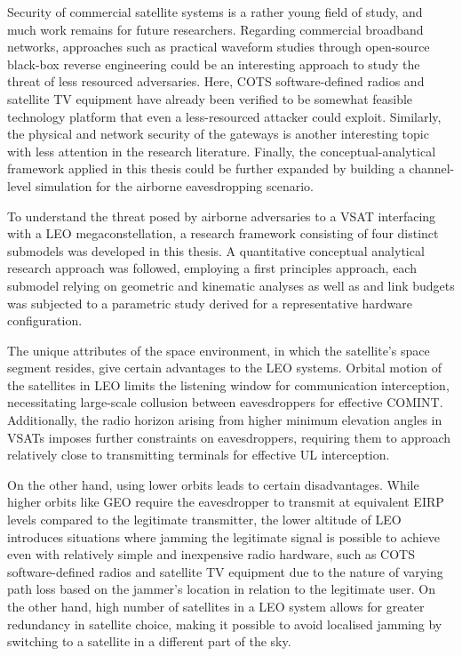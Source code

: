 \documentclass[english, 12pt, a4paper, elec, utf8, a-1b, online]{aaltothesis}
\begin{document}
Security of commercial satellite systems is a rather young field of study, and much work remains for future researchers.
Regarding commercial broadband networks, approaches such as practical waveform studies through open-source black-box reverse engineering could be an interesting approach to study the threat of less resourced adversaries.
Here, COTS software-defined radios and satellite TV equipment have already been verified to be somewhat feasible technology platform that even a less-resourced attacker could exploit.
Similarly, the physical and network security of the gateways is another interesting topic with less attention in the research literature.
Finally, the conceptual-analytical framework applied in this thesis could be further expanded by building a channel-level simulation for the airborne eavesdropping scenario.

To understand the threat posed by airborne adversaries to a VSAT interfacing with a LEO megaconstellation, a research framework consisting of four distinct submodels was developed in this thesis. A quantitative conceptual analytical research approach was followed, employing a first principles approach, each submodel relying on geometric and kinematic analyses as well as and link budgets was subjected to a parametric study derived for a representative hardware configuration.

The unique attributes of the space environment, in which the satellite's space segment resides, give certain advantages to the LEO systems.
Orbital motion of the satellites in LEO limits the listening window for communication interception, necessitating large-scale collusion between eavesdroppers for effective COMINT.
Additionally, the radio horizon arising from higher minimum elevation angles in VSATs imposes further constraints on eavesdroppers, requiring them to approach relatively close to transmitting terminals for effective UL interception.

On the other hand, using lower orbits leads to certain disadvantages.
While higher orbits like GEO require the eavesdropper to transmit at equivalent EIRP levels compared to the legitimate transmitter, the lower altitude of LEO introduces situations where jamming the legitimate signal is possible to achieve even with relatively simple and inexpensive radio hardware, such as COTS software-defined radios and satellite TV equipment due to the nature of varying path loss based on the jammer's location in relation to the legitimate user. On the other hand, high number of satellites in a LEO system allows for greater redundancy in satellite choice, making it possible to avoid localised jamming by switching to a satellite in a different part of the sky. 
\end{document}
